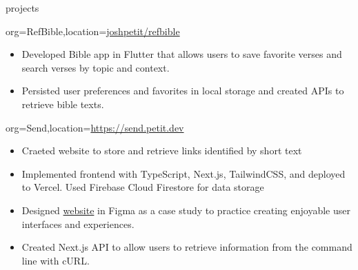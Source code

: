 \documentclass{resume}
\begin{document}
\begin{ResumeSection}{projects}
    \begin{ResumeSubsection}{org={RefBible},location={\href{https://github.com/joshpetit/refbible}{joshpetit/refbible}}}
        \begin{itemize}
            \item {Developed Bible app in Flutter that allows users to save
                favorite verses and search verses by topic and context.} 
            \item {Persisted user preferences and favorites in local storage and
                created APIs to retrieve bible texts.}
        \end{itemize}
    \end{ResumeSubsection}
    \begin{ResumeSubsection}{org={Send},location={\href{https://send.petit.dev}{https://send.petit.dev}}}
        \begin{itemize}
            \item {Craeted website to store and retrieve links identified by short text }
            \item {Implemented frontend with TypeScript, Next.js, TailwindCSS, and deployed to Vercel. Used Firebase Cloud Firestore for data storage}
            \item {Designed \href{https://send.petit.dev}{website}
                in Figma as a case study to practice creating enjoyable user interfaces and experiences.}
            \item {Created Next.js API to allow users to retrieve information from the command line with cURL.}
        \end{itemize}
    \end{ResumeSubsection}

\end{ResumeSection}
\end{document}
